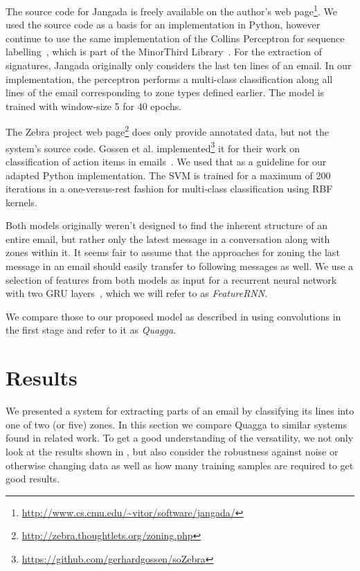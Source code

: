 \documentclass{llncs}
\begin{document}
The source code for Jangada is freely available on the author's web page\footnote{\url{http://www.cs.cmu.edu/~vitor/software/jangada/}}.
We used the source code as a basis for an implementation in Python, however continue to use the same implementation of the Collins Perceptron for sequence labelling~\cite{cperceptron}, which is part of the MinorThird Library~\cite{minorthird}.
For the extraction of signatures, Jangada originally only considers the last ten lines of an email.
In our implementation, the perceptron performs a multi-class classification along all lines of the email corresponding to zone types defined earlier.
The model is trained with window-size 5 for 40 epochs.

The Zebra project web page\footnote{\url{http://zebra.thoughtlets.org/zoning.php}} does only provide annotated data, but not the system's source code. 
Gossen et al. implemented\footnote{\url{https://github.com/gerhardgossen/soZebra}} it for their work on classification of action items in emails~\cite{sozebra}.
We used that as a guideline for our adapted Python implementation.
The SVM is trained for a maximum of 200 iterations in a one-versus-rest fashion for multi-class classification using RBF kernels.

Both models originally weren't designed to find the inherent structure of an entire email, but rather only the latest message in a conversation along with zones within it.
It seems fair to assume that the approaches for zoning the last message in an email should easily transfer to following messages as well.
We use a selection of features from both models as input for a recurrent neural network with two GRU layers~\cite{gru}, which we will refer to as \textit{FeatureRNN}.

We compare those to our proposed model as described in  using convolutions in the first stage and refer to it as \textit{Quagga}.



\section{Results}
We presented a system for extracting parts of an email by classifying its lines into one of two (or five) zones.
In this section we compare Quagga to similar systems found in related work.
To get a good understanding of the versatility, we not only look at the results shown in , but also consider the robustness against noise or otherwise changing data as well as how many training samples are required to get good results.
\end{document}
